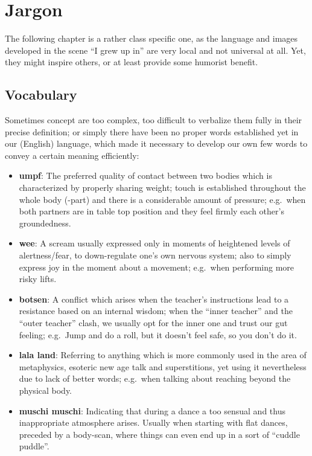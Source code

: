 \section{Jargon}\label{sec:jargon}

The following chapter is a rather class specific one, as the language and images developed in the scene ``I grew up in'' are very local and not universal at all.
Yet, they might inspire others, or at least provide some humorist benefit.

\subsection{Vocabulary}\label{subsec:vocabulary}

Sometimes concept are too complex, too difficult to verbalize them fully in their precise definition; or simply there have been no proper words established yet in our (English) language, which made it necessary to develop our own few words to convey a certain meaning efficiently:

\begin{itemize}
    \item \textbf{umpf}: The preferred quality of contact between two bodies which is characterized by properly sharing weight; touch is established throughout the whole body (-part) and there is a considerable amount of pressure; e.g.\ when both partners are in table top position and they feel firmly each other's groundedness.
    \item \textbf{wee}: A scream usually expressed only in moments of heightened levels of alertness/fear, to down-regulate one's own nervous system; also to simply express joy in the moment about a movement; e.g.\ when performing more risky lifts.
    \item \textbf{botsen}: A conflict which arises when the teacher's instructions lead to a resistance based on an internal wisdom; when the ``inner teacher'' and the ``outer teacher'' clash, we usually opt for the inner one and trust our gut feeling; e.g.\ Jump and do a roll, but it doesn't feel safe, so you don't do it.
    \item \textbf{lala land}: Referring to anything which is more commonly used in the area of metaphysics, esoteric new age talk and superstitions, yet using it nevertheless due to lack of better words; e.g.\ when talking about reaching beyond the physical body.
    \item \textbf{muschi muschi}: Indicating that during a dance a too sensual and thus inappropriate atmosphere arises.
    Usually when starting with flat dances, preceded by a body-scan, where things can even end up in a sort of ``cuddle puddle''.
\end{itemize}

